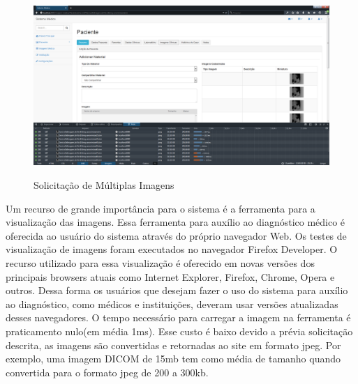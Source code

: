 \begin{figure}[ht]
	\centering	
	\caption[\hspace{0.1cm}Imagens Clínicas.]{Solicitação de Múltiplas Imagens}
	\vspace{-0.4cm}
	\includegraphics[width=.8\textwidth]{figuras/solicitacaoMultiplasImagens15mb.png}
	\vspace{-0.2cm}
	\label{fig:figura5}
\end{figure}

Um recurso de grande importância para o sistema é a ferramenta para a visualização das imagens. Essa ferramenta para auxílio ao diagnóstico médico é oferecida ao usuário do 
sistema através do próprio navegador Web. Os testes de visualização de imagens foram executados no navegador Firefox Developer. O recurso utilizado para essa visualização é 
oferecido em novas versões dos principais browsers atuais como Internet Explorer, Firefox, Chrome, Opera e outros. Dessa forma os usuários que desejam fazer o uso do sistema 
para auxílio ao diagnóstico, como médicos e instituições, deveram usar versões atualizadas desses navegadores. O tempo necessário para carregar a imagem na ferramenta é
praticamento nulo(em média 1ms). Esse custo é baixo devido a prévia solicitação descrita, as imagens são convertidas e retornadas ao site em formato jpeg. Por exemplo, uma 
imagem DICOM de 15mb tem como média de tamanho quando convertida para o formato jpeg de 200 a 300kb.

